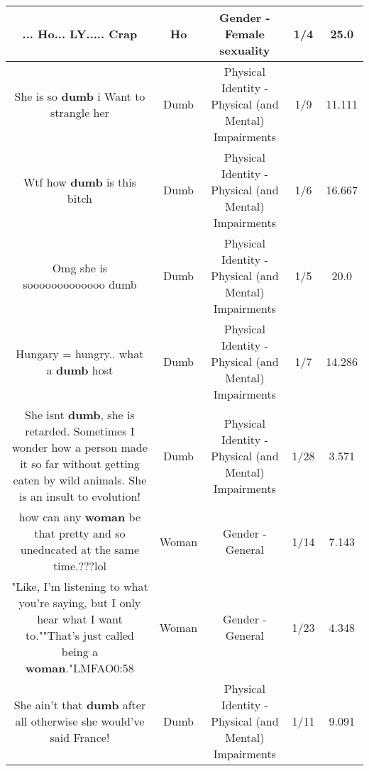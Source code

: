 \documentclass[11pt]{article}
\newlength\mylength
\begin{document}
\begin{center}
\begin{longtable}{|C{.65\mylength}|C{.30\mylength}|C{.12\mylength}|C{.12\mylength}|C{.12\mylength}|}
  \small ... \textbf{Ho}... LY..... Crap\normalsize   & Ho & Gender - Female sexuality & 1/4 & 25.0 \\  \hline
  \small She is so \textbf{dumb} i Want to strangle her\normalsize   & Dumb & Physical Identity - Physical (and Mental) Impairments & 1/9 & 11.111 \\  \hline
  \small Wtf how \textbf{dumb} is this bitch\normalsize   & Dumb & Physical Identity - Physical (and Mental) Impairments & 1/6 & 16.667 \\  \hline
  \small Omg she is sooooooooooooo dumb\normalsize   & Dumb & Physical Identity - Physical (and Mental) Impairments & 1/5 & 20.0 \\  \hline
  \small Hungary = hungry.. what a \textbf{dumb} host\normalsize   & Dumb & Physical Identity - Physical (and Mental) Impairments & 1/7 & 14.286 \\  \hline
  \small She isnt \textbf{dumb}, she is retarded. Sometimes I wonder how a person made it so far without getting eaten by wild animals. She is an insult to evolution!\normalsize   & Dumb & Physical Identity - Physical (and Mental) Impairments & 1/28 & 3.571 \\  \hline
  \small how can any \textbf{woman} be that pretty and so uneducated at the same time.???lol\normalsize   & Woman & Gender - General & 1/14 & 7.143 \\  \hline
  \small "Like, I'm listening to what you're saying, but I only hear what I want to.""That's just called being a \textbf{woman}."LMFAO0:58\normalsize   & Woman & Gender - General & 1/23 & 4.348 \\  \hline
  \small She ain't that \textbf{dumb} after all otherwise she would've said France!\normalsize   & Dumb & Physical Identity - Physical (and Mental) Impairments & 1/11 & 9.091 \\  \hline

\end{longtable}
\end{center}
\end{document}
